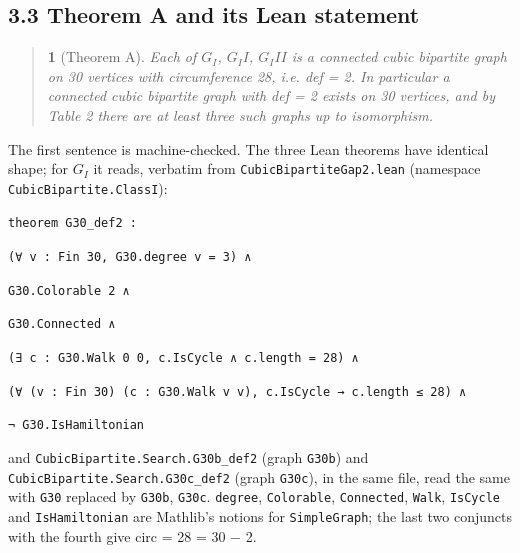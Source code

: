 \documentclass[11pt,a4paper]{article}
\theoremstyle{named}
\newtheorem*{namedthm}{}
\begin{document}
\subsection*{3.3 Theorem A and its Lean statement}
\begin{quote}
\begin{namedthm}[Theorem A]
Each of $G_I$, $G_II$, $G_III$ is a connected cubic bipartite graph on 30 vertices with circumference 28, i.e. def = 2. In particular a connected cubic bipartite graph with def = 2 exists on 30 vertices, and by Table 2 there are at least three such graphs up to isomorphism.
\end{namedthm}
\end{quote}
The first sentence is machine-checked. The three Lean theorems have identical shape; for $G_I$ it reads, verbatim from \texttt{CubicBipartiteGap2.\allowbreak{}lean} (namespace \texttt{CubicBipartite.\allowbreak{}ClassI}):

\begin{leancode}
\item \texttt{theorem\ \allowbreak{}G30\_\allowbreak{}def2\ \allowbreak{}:}
\item \texttt{(∀\ \allowbreak{}v\ \allowbreak{}:\ \allowbreak{}Fin\ \allowbreak{}30,\ \allowbreak{}G30.\allowbreak{}degree\ \allowbreak{}v\ \allowbreak{}=\ \allowbreak{}3)\ \allowbreak{}∧}
\item \texttt{G30.\allowbreak{}Colorable\ \allowbreak{}2\ \allowbreak{}∧}
\item \texttt{G30.\allowbreak{}Connected\ \allowbreak{}∧}
\item \texttt{(∃\ \allowbreak{}c\ \allowbreak{}:\ \allowbreak{}G30.\allowbreak{}Walk\ \allowbreak{}0\ \allowbreak{}0,\ \allowbreak{}c.\allowbreak{}IsCycle\ \allowbreak{}∧\ \allowbreak{}c.\allowbreak{}length\ \allowbreak{}=\ \allowbreak{}28)\ \allowbreak{}∧}
\item \texttt{(∀\ \allowbreak{}(v\ \allowbreak{}:\ \allowbreak{}Fin\ \allowbreak{}30)\ \allowbreak{}(c\ \allowbreak{}:\ \allowbreak{}G30.\allowbreak{}Walk\ \allowbreak{}v\ \allowbreak{}v),\ \allowbreak{}c.\allowbreak{}IsCycle\ \allowbreak{}→\ \allowbreak{}c.\allowbreak{}length\ \allowbreak{}≤\ \allowbreak{}28)\ \allowbreak{}∧}
\item \texttt{¬\ \allowbreak{}G30.\allowbreak{}IsHamiltonian}
\end{leancode}
and \texttt{CubicBipartite.\allowbreak{}Search.\allowbreak{}G30b\_\allowbreak{}def2} (graph \texttt{G30b}) and \texttt{CubicBipartite.\allowbreak{}Search.\allowbreak{}G30c\_\allowbreak{}def2} (graph \texttt{G30c}), in the same file, read the same with \texttt{G30} replaced by \texttt{G30b}, \texttt{G30c}. \texttt{degree}, \texttt{Colorable}, \texttt{Connected}, \texttt{Walk}, \texttt{IsCycle} and \texttt{IsHamiltonian} are Mathlib's notions for \texttt{SimpleGraph}; the last two conjuncts with the fourth give circ = 28 = 30 − 2.
\end{document}
